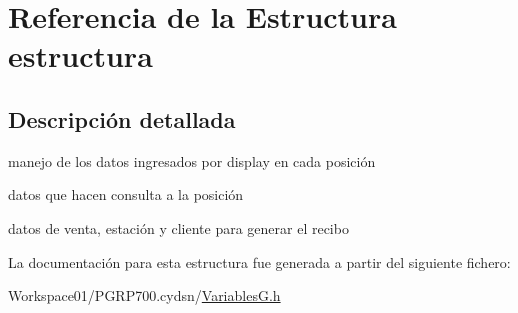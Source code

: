 \hypertarget{structestructura}{}\section{Referencia de la Estructura estructura}
\label{structestructura}


\subsection{Descripción detallada}
manejo de los datos ingresados por display en cada posición

datos que hacen consulta a la posición

datos de venta, estación y cliente para generar el recibo 

La documentación para esta estructura fue generada a partir del siguiente fichero\+:\begin{DoxyCompactItemize}
\item 
Workspace01/\+P\+G\+R\+P700.\+cydsn/\mbox{\hyperlink{_variables_g_8h}{Variables\+G.\+h}}\end{DoxyCompactItemize}
